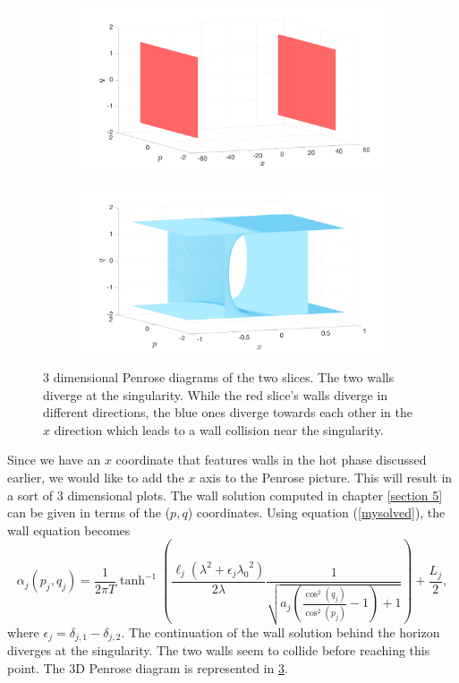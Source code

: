 \begin{figure}
    \centering
    \begin{subfigure}[b]{0.45\textwidth}
        \centering
        \includegraphics[width=\textwidth]{figures/pen3dred.png}
        \caption{}
        \label{penrosered}
    \end{subfigure}
    \hfill
    \begin{subfigure}[b]{0.45\textwidth}
        \centering
        \includegraphics[width=\textwidth]{figures/pen3dblue.png}
        \caption{}
        \label{penroseblue}
    \end{subfigure}
    \caption{3 dimensional Penrose diagrams of the two slices. The two walls diverge at the singularity. While the red slice's walls diverge in different directions, the blue ones diverge towards each other in the $x$ direction which leads to a wall collision near the singularity.}
    \label{penrose3d}
\end{figure}

Since we have an $x$ coordinate that features walls in the hot phase discussed earlier, we would like to add the $x$ axis to the Penrose picture. This will result in a sort of 3 dimensional plots. The wall solution computed in chapter \ref{section 5} can be given in terms of the ($p,q$) coordinates. Using equation (\ref{mysolved}), the wall equation becomes
\begin{equation}
    \alpha_j(p_j,q_j) = \frac{1}{2\pi T}\tanh^{-1}\left(\frac{\ell_j\left(\lambda^2+\epsilon_j{\lambda_0}^2\right)}{2\lambda}\frac{1}{\sqrt{a_j\left(\frac{\cos^2(q_j)}{\cos^2(p_j)}-1\right)+1}}\right) + \frac{L_j}{2},
\end{equation}
where $\epsilon_j=\delta_{j,1}-\delta_{j,2}$. The continuation of the wall solution behind the horizon diverges at the singularity. The two walls seem to collide before reaching this point. The 3D Penrose diagram is represented in \ref{penrose3d}.

